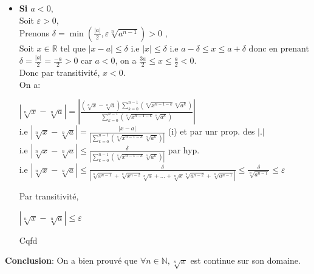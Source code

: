 \documentclass[a4paper,11pt]{report}
\begin{document}
\begin{itemize}
\begin{itemize}
		\item \textbf{Si $a < 0$},\\
		Soit $\varepsilon > 0$,\\
		Prenons $\delta = \min{(\frac{|a|}{2},\varepsilon \sqrt[n\,]{a^{n-1}})} > 0$ ,\\
		Soit $x \in \mathbb{R}$ tel que $|x-a| \le \delta$ i.e $|x| \le \delta$ i.e $a-\delta \le x \le a+\delta$ donc en prenant $\delta = \frac{|a|}{2} = \frac{-a}{2}> 0$ car $a < 0$, on a $\frac{3a}{2} \le x \le \frac{a}{2}<0$.\\ Donc par transitivité, $x<0$.\\
		On a:\\
		\begin{center}
		$|\sqrt[n\,]{x}-\sqrt[n\,]{a}| = |\frac{(\sqrt[n\,]{x}-\sqrt[n\,]{a})\sum\limits_{k=0}^{n-1}{(\sqrt[n\,]{x^{n-1-k}}\sqrt[n\,]{a^k})}}{\sum\limits_{k=0}^{n-1}{(\sqrt[n\,]{x^{n-1-k}}\sqrt[n\,]{a^k})}}|$\\
		
		i.e $|\sqrt[n\,]{x}-\sqrt[n\,]{a}| = \frac{|x-a|}{|\sum\limits_{k=0}^{n-1}{(\sqrt[n\,]{x^{n-1-k}}\sqrt[n\,]{a^k})}|}$ (i) et par unr prop. des $|.|$\\
		
		i.e $|\sqrt[n\,]{x}-\sqrt[n\,]{a}| \le \frac{\delta}{|\sum\limits_{k=0}^{n-1}{(\sqrt[n\,]{x^{n-1-k}}\sqrt[n\,]{a^k})}|}$ par hyp.\\
		
		i.e $|\sqrt[n\,]{x}-\sqrt[n\,]{a}| \le \frac{\delta}{|\sqrt[n\,]{x^{n-1}}+\sqrt[n\,]{x^{n-2}}\sqrt[n\,]{a}+...+\sqrt[n\,]{x}\sqrt[n\,]{a^{n-2}}+\sqrt[n\,]{a^{n-1}}|} \le \frac{\delta}{\sqrt[n\,]{a^{n-1}}} \le \varepsilon$\\
		\end{center}
		Par transitivité,\\
		\begin{center}
			$|\sqrt[n\,]{x}-\sqrt[n\,]{a}| \le \varepsilon$\\
		\end{center}
		Cqfd\\
	\end{itemize}
\end{itemize}
\textbf{Conclusion}: On a bien prouvé que $\forall n \in \mathbb{N}, \sqrt[n\,]{x}$ est continue sur son domaine.
\end{document}
